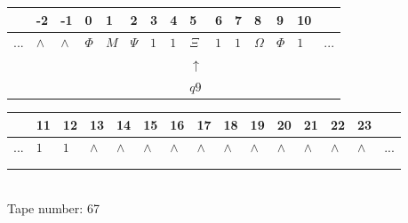 \documentclass[11pt]{article}
\begin{document}
\begin{table}[H]
\centering
\begin{tabular}{lllllllllllllll}
 & -2 & -1 & 0 & 1 & 2 & 3 & 4 & 5 & 6 & 7 & 8 & 9 & 10 & \\
\hline
$...$ & \multicolumn{1}{|l|}{$\wedge$} & \multicolumn{1}{|l|}{$\wedge$} & \multicolumn{1}{|l|}{$\Phi$} & \multicolumn{1}{|l|}{$M$} & \multicolumn{1}{|l|}{$\Psi$} & \multicolumn{1}{|l|}{$1$} & \multicolumn{1}{|l|}{$1$} & \multicolumn{1}{|l|}{$\Xi$} & \multicolumn{1}{|l|}{$1$} & \multicolumn{1}{|l|}{$1$} & \multicolumn{1}{|l|}{$\Omega$} & \multicolumn{1}{|l|}{$\Phi$} & \multicolumn{1}{|l|}{$1$} & $...$\\
\hline
&  &  &  &  &  &  &  & $\uparrow$ &  &  &  &  &  &  \\
&  &  &  &  &  &  &  & $ q9 $ &  &  &  &  &  &  \\
\end{tabular}
\begin{tabular}{lllllllllllllll}
 & 11 & 12 & 13 & 14 & 15 & 16 & 17 & 18 & 19 & 20 & 21 & 22 & 23 & \\
\hline
$...$ & \multicolumn{1}{|l|}{$1$} & \multicolumn{1}{|l|}{$1$} & \multicolumn{1}{|l|}{$\wedge$} & \multicolumn{1}{|l|}{$\wedge$} & \multicolumn{1}{|l|}{$\wedge$} & \multicolumn{1}{|l|}{$\wedge$} & \multicolumn{1}{|l|}{$\wedge$} & \multicolumn{1}{|l|}{$\wedge$} & \multicolumn{1}{|l|}{$\wedge$} & \multicolumn{1}{|l|}{$\wedge$} & \multicolumn{1}{|l|}{$\wedge$} & \multicolumn{1}{|l|}{$\wedge$} & \multicolumn{1}{|l|}{$\wedge$} & $...$\\
\hline
&  &  &  &  &  &  &  &  &  &  &  &  &  &  \\
&  &  &  &  &  &  &  &  &  &  &  &  &  &  \\
\end{tabular}
\\
Tape number: 67
\noindent\makebox[\linewidth]{\hdashrule{\textwidth}{1pt}{1pt}}\end{table}
\clearpage
\end{document}
